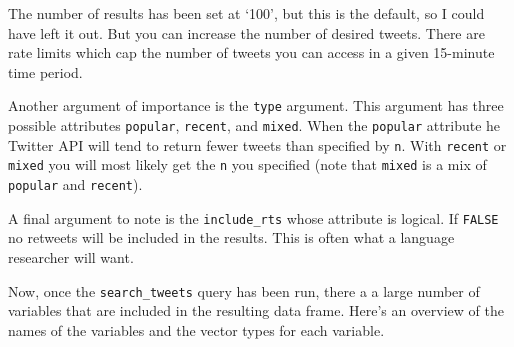 \documentclass[
  letterpaper,
]{scrbook}
\begin{document}
The number of results has been set at `100', but this is the default, so
I could have left it out. But you can increase the number of desired
tweets. There are rate limits which cap the number of tweets you can
access in a given 15-minute time period.

Another argument of importance is the \texttt{type} argument. This
argument has three possible attributes \texttt{popular},
\texttt{recent}, and \texttt{mixed}. When the \texttt{popular} attribute
he Twitter API will tend to return fewer tweets than specified by
\texttt{n}. With \texttt{recent} or \texttt{mixed} you will most likely
get the \texttt{n} you specified (note that \texttt{mixed} is a mix of
\texttt{popular} and \texttt{recent}).

A final argument to note is the \texttt{include\_rts} whose attribute is
logical. If \texttt{FALSE} no retweets will be included in the results.
This is often what a language researcher will want.

Now, once the \texttt{search\_tweets} query has been run, there a a
large number of variables that are included in the resulting data frame.
Here's an overview of the names of the variables and the vector types
for each variable.
\end{document}
